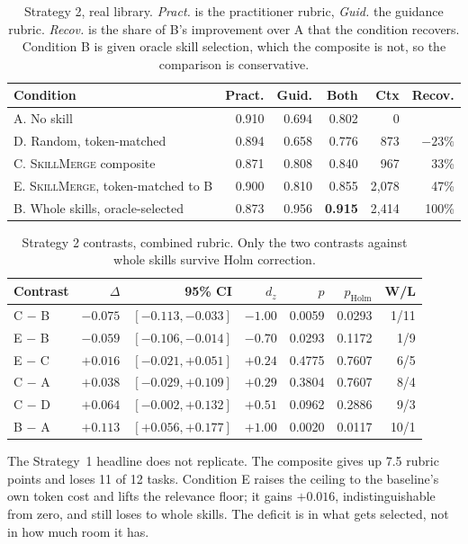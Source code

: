 \documentclass[11pt]{article}
\newcommand{\sm}{\textsc{SkillMerge}}
\begin{document}
\begin{table}[t]\centering\small
\begin{tabular}{lrrrrr}
\toprule
Condition & Pract. & Guid. & Both & Ctx & Recov. \\
\midrule
A. No skill & 0.910 & 0.694 & 0.802 & 0 & \\
D. Random, token-matched & 0.894 & 0.658 & 0.776 & 873 & $-23\%$ \\
C. \sm{} composite & 0.871 & 0.808 & 0.840 & 967 & 33\% \\
E. \sm{}, token-matched to B & 0.900 & 0.810 & 0.855 & 2{,}078 & 47\% \\
B. Whole skills, oracle-selected & 0.873 & 0.956 & \textbf{0.915} & 2{,}414 & 100\% \\
\bottomrule
\end{tabular}
\caption{Strategy 2, real library. \emph{Pract.} is the practitioner rubric, \emph{Guid.} the
guidance rubric. \emph{Recov.} is the share of B's improvement over A that the condition recovers.
Condition B is given oracle skill selection, which the composite is not, so the comparison is
conservative.}
\label{tab:s2main}
\end{table}

\begin{table}[t]\centering\small
\begin{tabular}{lrrrrrr}
\toprule
Contrast & $\Delta$ & 95\% CI & $d_z$ & $p$ & $p_{\text{Holm}}$ & W/L \\
\midrule
C $-$ B & $-0.075$ & $[-0.113, -0.033]$ & $-1.00$ & 0.0059 & 0.0293 & 1/11 \\
E $-$ B & $-0.059$ & $[-0.106, -0.014]$ & $-0.70$ & 0.0293 & 0.1172 & 1/9 \\
E $-$ C & $+0.016$ & $[-0.021, +0.051]$ & $+0.24$ & 0.4775 & 0.7607 & 6/5 \\
C $-$ A & $+0.038$ & $[-0.029, +0.109]$ & $+0.29$ & 0.3804 & 0.7607 & 8/4 \\
C $-$ D & $+0.064$ & $[-0.002, +0.132]$ & $+0.51$ & 0.0962 & 0.2886 & 9/3 \\
B $-$ A & $+0.113$ & $[+0.056, +0.177]$ & $+1.00$ & 0.0020 & 0.0117 & 10/1 \\
\bottomrule
\end{tabular}
\caption{Strategy 2 contrasts, combined rubric. Only the two contrasts against whole skills survive
Holm correction.}
\label{tab:s2contrasts}
\end{table}

The Strategy~1 headline does not replicate. The composite gives up 7.5 rubric points and loses 11
of 12 tasks. Condition E raises the ceiling to the baseline's own token cost and lifts the relevance
floor; it gains $+0.016$, indistinguishable from zero, and still loses to whole skills. The deficit
is in what gets selected, not in how much room it has.
\end{document}
